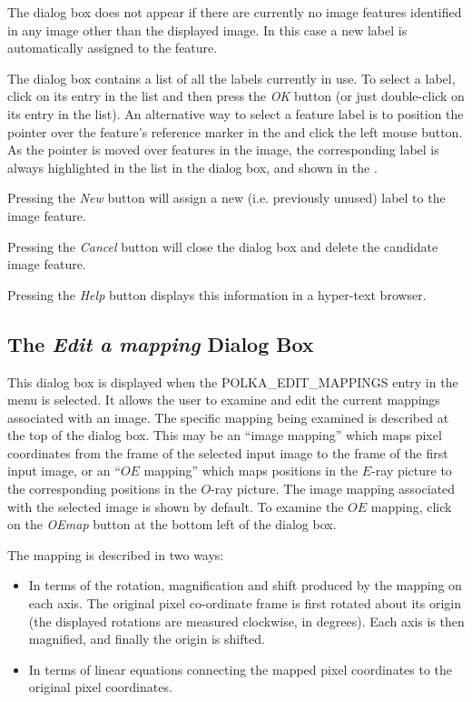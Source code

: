 \documentclass[11pt,nolof]{starlink}
\providecommand{\mylabel}[1] {\xlabel{#1}\label{#1}}
\begin{document}
The dialog box does not appear if there are currently no image features
identified in any image other than the displayed image. In this case a
new label is automatically assigned to the feature.

The dialog box contains a list of all the labels currently in use. To
select a label, click on its entry in the list and then press the \emph{OK} button (or just double-click on its entry in the list). An
alternative way to select a feature label is to position the pointer over
the feature's reference marker in the  and click the left mouse button. As the
pointer is moved over features in the image, the corresponding label
is always highlighted in the list in the dialog box, and shown in the
.

Pressing the \emph{New} button will assign a new (i.e. previously unused)
label to the image feature.

Pressing the \emph{Cancel} button will close the dialog box and delete the
candidate image feature.

Pressing the \emph{Help} button displays this information in a hyper-text
browser.

\subsection {\mylabel{POLKA_EDIT_MAPPING_DIALOG}The \emph{Edit a mapping}
Dialog Box}
This dialog box is displayed when the 
{POLKA_EDIT_MAPPINGS} entry in the 
menu is selected. It allows the user to examine and edit the current
mappings associated with an image. The specific mapping being examined is
described at the top of the dialog box. This may be an ``image mapping''
which maps pixel coordinates from the frame of the selected input image
to the frame of the first input image, or an ``$OE$ mapping'' which maps
positions in the $E$-ray picture to the corresponding positions in the
$O$-ray picture. The image mapping associated with the selected image is
shown by default. To examine the $OE$ mapping, click on the \emph{OEmap}
button at the bottom left of the dialog box.

The mapping is described in two ways:

\begin{itemize}
\item In terms of the rotation, magnification and shift produced
by the mapping on each axis. The original pixel co-ordinate frame
is first rotated about its origin (the displayed rotations are measured
clockwise, in degrees). Each axis is then magnified, and finally the
origin is shifted.

\item In terms of linear equations connecting the mapped pixel
coordinates to the original pixel coordinates.
\end{itemize}
\end{document}
